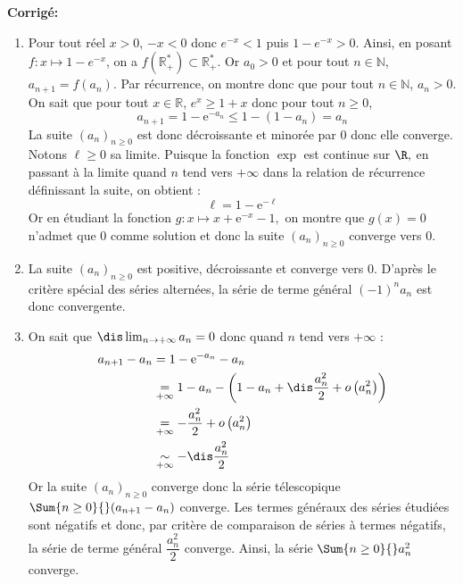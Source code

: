 \documentclass[a4paper,twoside,french,10pt]{VcCours}
\newcommand{\corr}{\textbf{Corrigé:}}
\begin{document}
\corr \begin{enumerate}
\item Pour tout réel $x>0$, $-x<0$ donc $e^{-x}<1$ puis $1-e^{-x}>0$. Ainsi, en posant $f: x \mapsto 1-e^{-x}$, on a $f(\mathbb{R}_+^{*}) \subset \mathbb{R}_+^{*}$. Or $a_0 >0$ et pour tout $n \in \mathbb{N}$, $a_{n+1}=f(a_n)$. Par récurrence, on montre donc que pour tout $n \in \mathbb{N}$, $a_n >0$. On sait que pour tout $x \in \mathbb{R}$, $e^x \geq 1+x$ donc pour tout $n \geq 0$,
 $$a_{n+1}=1- {\mathrm{e}}^{ - a_n } \leq 1-(1-a_n)=a_n$$
La suite $(a_n)_{n \geq 0}$ est donc d\'ecroissante et minorée par $0$ donc elle converge. Notons $\ell\geq 0$ sa limite. Puisque la fonction $\exp$ est continue sur $\R,$ en passant \`a la limite quand $n$ tend vers $+\infty$ dans la relation de récurrence définissant la suite, on obtient :
$$\ell= 1 - {\mathrm{e}}^{ - \ell }$$
Or en \'etudiant la fonction $g : x\longmapsto x+{\mathrm{e}}^{ - x }-1,$ on montre que $g(x)=0$ n'admet que $0$ comme solution et donc la suite $(a_n)_{n \geq 0}$ converge vers $0$.
\item La suite $(a_n)_{n \geq 0}$ est positive, décroissante et converge vers $0$. D'après le critère spécial des séries alternées, la série de terme général $(-1)^n a_n$ est donc convergente. 
\item On sait que $\dis\lim_{n\to+\infty}a_n=0$ donc quand $n$ tend vers $+ \infty$ :
\begin{align*}
a_{n+1}-a_n & = 1 - {\mathrm{e}}^{ - a_n }-a_n \\
&  \underset{+ \infty}{=} 1-a_n-\left(1-a_n+\dis\frac{a_n^2}{2} + o \left(a_n^2\right)\right) \\
& \underset{+ \infty}{=} - \dfrac{a_n^2}{2} + o\left(a_n^2\right)\\
& \underset{+ \infty}{\sim} -\dis\frac{a_n^2}{2} \\
\end{align*}
Or la suite $(a_n)_{n \geq 0}$ converge donc la s\'erie t\'elescopique $\Sum{n \geq 0}{} (a_{n+1}-a_n)$ converge. Les termes généraux des séries étudiées sont négatifs et donc, par critère de comparaison de séries à termes négatifs, la s\'erie de terme général $\dfrac{a_n^2}{2}$ converge. Ainsi, la s\'erie $\Sum{n \geq 0}{} a_n^2$ converge.


\end{enumerate}
\end{document}

